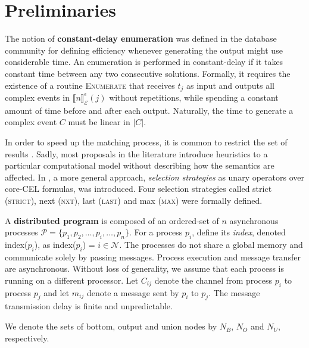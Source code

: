 \chapter{Preliminaries}\label{chapter:preliminaries}


The notion of \textbf{constant-delay enumeration} was defined in the database community \cite{constant-delay-1, constant-delay-2} for defining efficiency whenever generating the output might use considerable time. An enumeration is performed in constant-delay if it takes constant time between any two consecutive solutions. Formally, it requires the existence of a routine \textsc{Enumerate} that receives $t_{j}$ as input and outputs all complex events in $\llbracket n \rrbracket^{\epsilon}_{\mathcal{E}}(j)$ without repetitions, while spending a constant amount of time before and after each output. Naturally, the time to generate a complex event $C$ must be linear in $|C|$.





In order to speed up the matching process, it is common to restrict the set of results \cite{10.1016/j.scico.2010.06.010, 10.1145/1142473.1142520, Zhang2014OnCA}. Sadly, most proposals in the literature introduce heuristics to a particular computational model without describing how the semantics are affected. In \cite{formal-framework-cer}, a more general approach, \emph{selection strategies} as unary operators over core-CEL formulas, was introduced. Four selection strategies called strict (\textsc{strict}), next (\textsc{nxt}), last (\textsc{last}) and max (\textsc{max}) were formally defined.


A \textbf{distributed program} is composed of an ordered-set of $n$ asynchronous processes $\mathcal{P} = \{ p_{1}, p_{2}, \ldots, p_{i}, \ldots, p_{n}\}$. For a process $p_{i}$, define its \emph{index}, denoted index($p_{i}$), as index($p_{i}$) = $i \in \mathcal{N}$. The processes do not share a global memory and communicate solely by passing messages. Process execution and message transfer are asynchronous. Without loss of generality, we assume that each process is running on a different processor. Let $C_{ij}$ denote the channel from process $p_{i}$ to process $p_{j}$ and let $m_{ij}$ denote a message sent by $p_{i}$ to $p_{j}$. The message transmission delay is finite and unpredictable.



We denote the sets of bottom, output and union nodes by $N_{B}$, $N_{O}$ and $N_{U}$, respectively.
